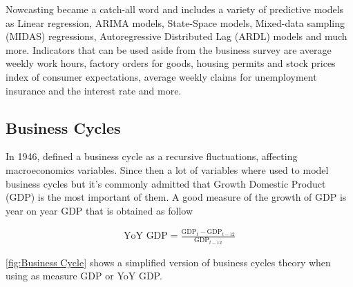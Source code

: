 \documentclass[12pt,a4paper,oneside]{book}
\begin{document}
Nowcasting became a catch-all word and includes a variety of predictive models as Linear regression, ARIMA models, State-Space models, Mixed-data sampling (MIDAS) regressions, Autoregressive Distributed Lag (ARDL) models  and much more.
Indicators that can be used aside from the business survey are average weekly work hours, factory orders for goods, housing permits and stock prices index of consumer expectations, average weekly claims for unemployment insurance and the interest rate and more.


\subsection{Business Cycles}
\label{sec:Business Cycles}

In 1946, \citeauthor{mitchell_measuring_1946} defined a business cycle as a recursive fluctuations, affecting macroeconomics variables. Since then a lot of variables where used to model business cycles but it's commonly admitted that Growth Domestic Product (GDP) is the most important of them. 
A good measure of the growth of GDP is year on year GDP that is obtained as follow

\begin{eqnarray}
	\mbox{YoY GDP} = \frac{\mbox{GDP}_t - \mbox{GDP}_{t-12}}{\mbox{GDP}_{t-12}}      \label{eq:YoY GDP}
\end{eqnarray}

\autoref{fig:Business Cycle} shows a simplified version of business cycles theory when using as measure GDP or YoY GDP.
\end{document}
